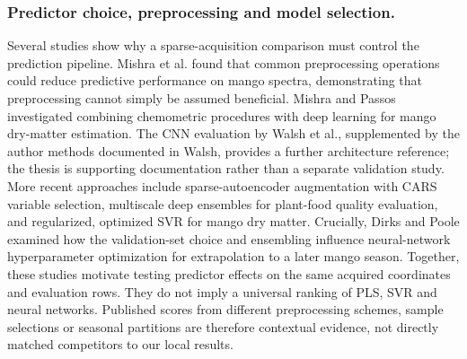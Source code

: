 \documentclass[Review,sagev,times]{sagej}
\begin{document}
\subsubsection{Predictor choice, preprocessing and model selection.}
Several studies show why a sparse-acquisition comparison must control the prediction pipeline. Mishra et al.\citep{mishra2021preprocessing} found that common preprocessing operations could reduce predictive performance on mango spectra, demonstrating that preprocessing cannot simply be assumed beneficial. Mishra and Passos\citep{mishra2021synergy} investigated combining chemometric procedures with deep learning for mango dry-matter estimation. The CNN evaluation by Walsh et al.\citep{walsh2024}, supplemented by the author methods documented in Walsh\citep{walshthesis2024}, provides a further architecture reference; the thesis is supporting documentation rather than a separate validation study. More recent approaches include sparse-autoencoder augmentation with CARS variable selection,\citep{yang2025} multiscale deep ensembles for plant-food quality evaluation,\citep{yang2026} and regularized, optimized SVR for mango dry matter.\citep{ma2026} Crucially, Dirks and Poole\citep{dirks2022} examined how the validation-set choice and ensembling influence neural-network hyperparameter optimization for extrapolation to a later mango season. Together, these studies motivate testing predictor effects on the same acquired coordinates and evaluation rows. They do not imply a universal ranking of PLS, SVR and neural networks. Published scores from different preprocessing schemes, sample selections or seasonal partitions are therefore contextual evidence, not directly matched competitors to our local results.
\end{document}
